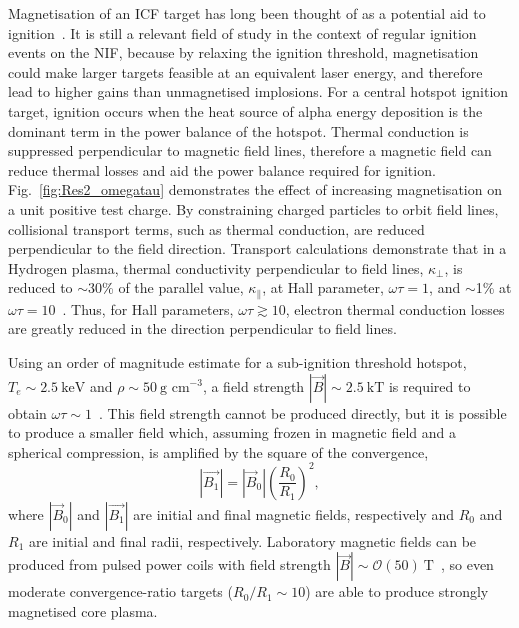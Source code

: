 Magnetisation of an \ac{ICF} target has long been thought of as a potential aid to ignition~\cite{lindemuth_parameter_1983,jones_physics_1986}.
It is still a relevant field of study in the context of regular ignition events on the \ac{NIF}, because by relaxing the ignition threshold, magnetisation could make larger targets feasible at an equivalent laser energy, and therefore lead to higher gains than unmagnetised implosions.
For a central hotspot ignition target, ignition occurs when the heat source of alpha energy deposition is the dominant term in the power balance of the hotspot.
Thermal conduction is suppressed perpendicular to magnetic field lines, therefore a magnetic field can reduce thermal losses and aid the power balance required for ignition.
Fig.~\ref{fig:Res2_omegatau} demonstrates the effect of increasing magnetisation on a unit positive test charge.
By constraining charged particles to orbit field lines, collisional transport terms, such as thermal conduction, are reduced perpendicular to the field direction.
Transport calculations demonstrate that in a Hydrogen plasma, thermal conductivity perpendicular to field lines, $\kappa_{\perp}$, is reduced to $\sim$30\% of the parallel value, $\kappa_{\parallel}$, at Hall parameter, $\omega\tau=1$, and $\sim$1\% at $\omega\tau=10$~\cite{epperlein_plasma_1986}.
Thus, for Hall parameters, $\omega\tau\gtrsim 10$, electron thermal conduction losses are greatly reduced in the direction perpendicular to field lines.

Using an order of magnitude estimate for a sub-ignition threshold hotspot, $T_e\sim 2.5\ \text{keV}$ and $\rho\sim50\ \text{g cm}^{-3}$, a field strength $|\vec{B}|\sim 2.5\ \text{kT}$ is required to obtain $\omega\tau\sim1$~\cite{oneill_modelling_2023}.
This field strength cannot be produced directly, but it is possible to produce a smaller field which, assuming frozen in magnetic field and a spherical compression, is amplified by the square of the convergence,
\begin{equation}
    \label{eq:Res2_flux_compression}
    |\vec{B_1}|=|\vec{B}_0| \left(\frac{R_0}{R_1}\right)^2,
\end{equation}
where $|\vec{B}_0|$ and $|\vec{B_1}|$ are initial and final magnetic fields, respectively and $R_0$ and $R_1$ are initial and final radii, respectively.
Laboratory magnetic fields can be produced from pulsed power coils with field strength $|\vec{B}|\sim\mathcal{O}(50)\ \text{T}$~\cite{fiksel_note_2015}, so even moderate convergence-ratio targets ($R_0/R_1\sim10$) are able to produce strongly magnetised core plasma.

